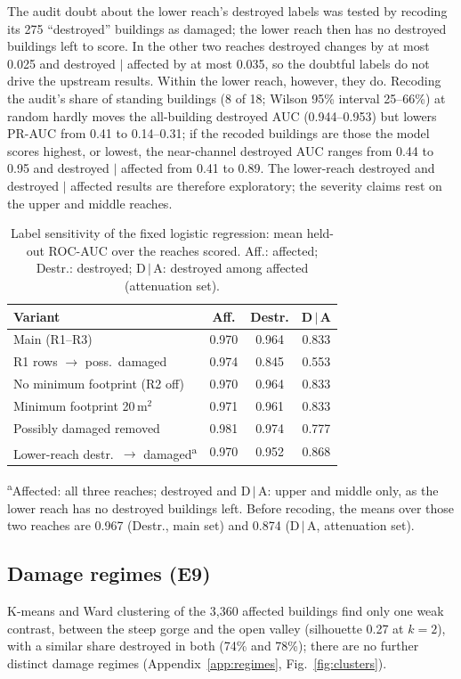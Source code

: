\documentclass[journal,a4paper]{IEEEtran}
\begin{document}
The audit doubt about the lower reach's destroyed labels was tested by recoding its 275 ``destroyed'' buildings as damaged; the lower reach then has no destroyed buildings left to score. In the other two reaches destroyed changes by at most 0.025 and destroyed $\mid$ affected by at most 0.035, so the doubtful labels do not drive the upstream results. Within the lower reach, however, they do. Recoding the audit's share of standing buildings (8 of 18; Wilson 95\% interval 25--66\%) at random hardly moves the all-building destroyed AUC (0.944--0.953) but lowers PR-AUC from 0.41 to 0.14--0.31; if the recoded buildings are those the model scores highest, or lowest, the near-channel destroyed AUC ranges from 0.44 to 0.95 and destroyed $\mid$ affected from 0.41 to 0.89. The lower-reach destroyed and destroyed $\mid$ affected results are therefore exploratory; the severity claims rest on the upper and middle reaches.

\begin{table}[t]
\centering\footnotesize
\setlength{\tabcolsep}{3pt}
\caption{Label sensitivity of the fixed logistic regression: mean held-out ROC-AUC over the reaches scored. Aff.: affected; Destr.: destroyed; D\,$\mid$\,A: destroyed among affected (attenuation set).}\label{tab:labsens}
\begin{tabular}{@{}lccc@{}}
\toprule
\textbf{Variant} & \textbf{Aff.} & \textbf{Destr.} & \textbf{D\,$\mid$\,A}\\
\midrule
Main (R1--R3) & 0.970 & 0.964 & 0.833\\
R1 rows $\rightarrow$ poss.\ damaged & 0.974 & 0.845 & 0.553\\
No minimum footprint (R2 off) & 0.970 & 0.964 & 0.833\\
Minimum footprint 20\,m$^2$ & 0.971 & 0.961 & 0.833\\
Possibly damaged removed & 0.981 & 0.974 & 0.777\\
Lower-reach destr.\ $\rightarrow$ damaged\textsuperscript{a} & 0.970 & 0.952 & 0.868\\
\bottomrule
\end{tabular}

{\scriptsize \textsuperscript{a}Affected: all three reaches; destroyed and D\,$\mid$\,A: upper and middle only, as the lower reach has no destroyed buildings left. Before recoding, the means over those two reaches are 0.967 (Destr., main set) and 0.874 (D\,$\mid$\,A, attenuation set).}
\end{table}

\subsection{Damage regimes (E9)}
K-means and Ward clustering of the 3,360 affected buildings find only one weak contrast, between the steep gorge and the open valley (silhouette 0.27 at $k = 2$), with a similar share destroyed in both (74\% and 78\%); there are no further distinct damage regimes (Appendix~\ref{app:regimes}, Fig.~\ref{fig:clusters}).
\end{document}
